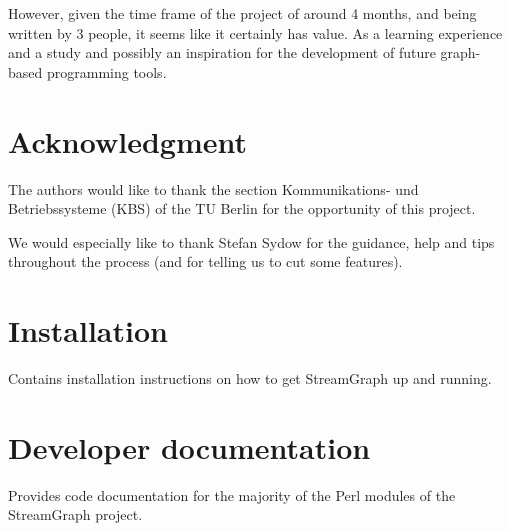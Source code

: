 \documentclass[journal]{IEEEtran}
\begin{document}
However, given the time frame of the project of around 4 months, and being
written by 3 people, it seems like it certainly has value. As a learning
experience and a study and possibly an inspiration for the development of
future graph-based programming tools.

\appendices


\section*{Acknowledgment}


\noindent The authors would like to thank the section Kommunikations- und
Betriebssysteme (KBS) of the TU Berlin for the opportunity of this project.

\noindent We would especially like to thank Stefan Sydow for the guidance, help and tips
throughout the process (and for telling us to cut some features).




\section{Installation}
\noindent Contains installation instructions on how to get StreamGraph up and
running.

\section{Developer documentation}
\noindent Provides code documentation for the majority of the Perl modules of
the StreamGraph project.

\ifCLASSOPTIONcaptionsoff
  \newpage
\fi





\newpage
~



\newpage
~


\end{document}
